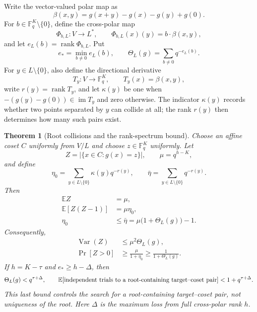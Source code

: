 \documentclass[11pt]{article}
\newtheorem{theorem}{Theorem}
\newcommand{\F}{\mathbb F}
\newcommand{\rank}{\operatorname{rank}}
\begin{document}
Write the vector-valued polar map as
\[
 \beta(x,y)=g(x+y)-g(x)-g(y)+g(0).
\]
For $b\in\F_q^K\setminus\{0\}$, define the cross-polar map
\begin{equation}\label{eq:cross-polar-map}
 \Phi_{b,L}:V\longrightarrow L^*,
 \qquad \Phi_{b,L}(x)(y)=b\cdot\beta(x,y),
\end{equation}
and let $e_L(b)=\rank\Phi_{b,L}$.  Put
\begin{equation}\label{eq:theta-def}
 e_* = \min_{b\ne0}e_L(b),
 \qquad
 \Theta_L(g)=\sum_{b\ne0}q^{-e_L(b)}.
\end{equation}
For $y\in L\setminus\{0\}$, also define the directional derivative
\begin{equation}\label{eq:directional-map}
 T_y:V\longrightarrow\F_q^K,
 \qquad T_y(x)=\beta(x,y),
\end{equation}
write $r(y)=\rank T_y$, and let
$\kappa(y)$ be one when $-(g(y)-g(0))\in\operatorname{im}T_y$ and zero
otherwise.  The indicator $\kappa(y)$ records whether two points separated by
$y$ can collide at all; the rank $r(y)$ then determines how many such pairs
exist.

\begin{theorem}[Root collisions and the rank-spectrum bound]
\label{thm:coset-success}
Choose an affine coset $C$ uniformly from $V/L$ and choose
$z\in\F_q^K$ uniformly.  Let
\[
 Z=|\{x\in C:g(x)=z\}|,
 \qquad \mu=q^{h-K},
\]
and define
\begin{equation}\label{eq:eta-def}
 \eta_0=\sum_{y\in L\setminus\{0\}}\kappa(y)q^{-r(y)},
 \qquad
 \bar\eta=\sum_{y\in L\setminus\{0\}}q^{-r(y)}.
\end{equation}
Then
\begin{align}
 \mathbb E Z&=\mu,\label{eq:EZ}\\
 \mathbb E[Z(Z-1)]&=\mu\eta_0,\label{eq:factorial-moment}\\
 \eta_0&\le\bar\eta
 =\mu\bigl(1+\Theta_L(g)\bigr)-1.\label{eq:eta-spectrum}
\end{align}
Consequently,
\begin{align}
 \operatorname{Var}(Z)&\le\mu^2\Theta_L(g),\label{eq:theta-var}\\
 \Pr[Z>0]&\ge\frac{\mu}{1+\eta_0}
 \ge\frac{1}{1+\Theta_L(g)}.\label{eq:coset-success}
\end{align}
If $h=K-\tau$ and $e_*\ge h-\Delta$, then
\begin{equation}\label{eq:defect-retry}
 \Theta_L(g)<q^{\tau+\Delta},
 \qquad
 \mathbb E[\textnormal{independent trials to a root-containing
 target--coset pair}]
 <1+q^{\tau+\Delta}.
\end{equation}
This last bound controls the search for a root-containing target--coset pair,
not uniqueness of the root.
Here $\Delta$ is the maximum loss from full cross-polar rank $h$.
\end{theorem}
\end{document}
